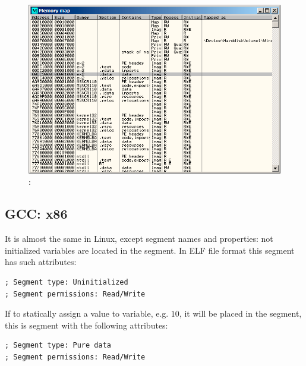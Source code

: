 \begin{figure}[H]
\centering
\includegraphics[scale=\FigScale]{patterns/04_scanf/ex2_olly_2.png}
\caption{\olly: }
\label{fig:scanf_ex2_olly_2}
\end{figure}

\subsection{GCC: x86}

{It is almost the same in Linux, except segment names and properties: 
not initialized variables are located in the  segment. 
In \ac{ELF} file format this segment has such attributes:}

\begin{lstlisting}
; Segment type: Uninitialized
; Segment permissions: Read/Write
\end{lstlisting}

{If to statically assign a value to variable, e.g. $10$, it will be placed in the  segment, 
this is segment with the following attributes:}

\begin{lstlisting}
; Segment type: Pure data
; Segment permissions: Read/Write
\end{lstlisting}

